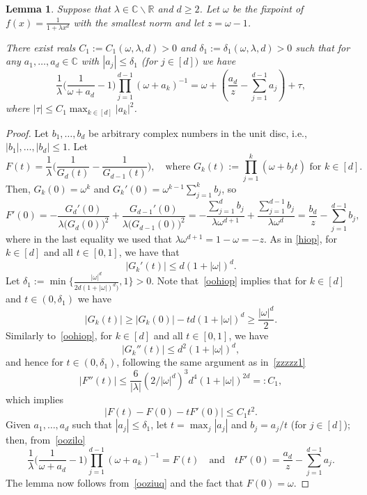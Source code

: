 \documentclass[11pt]{article}
\newtheorem{lemma}[theorem]{Lemma}
\def\Reals{\mathbb{R}}
\def\Complex{\mathbb{C}}
\begin{document}
\begin{lemma}\label{apxinv} Suppose that  $\lambda\in \Complex\backslash\Reals$ and $d\geq 2$. 
Let $\omega$ be the fixpoint of $f(x)=\frac{1}{1+\lambda x^{d}}$ with the smallest norm and let $z=\omega-1$.

There exist reals $C_1:=C_1(\omega,\lambda,d)>0$ and
$\delta_1:=\delta_1(\omega,\lambda,d)>0$ such that for
any $a_1,\dots,a_{d}\in\Complex$ with $|a_j|\leq\delta_1$ (for $j\in [d])$ we have
\begin{equation}
\frac{1}{\lambda}\Big(\frac{1}{\omega+a_{d}}-1\Big) \prod_{j=1}^{d-1} (\omega + a_k)^{-1} = \omega + \left( \frac{a_d}{z} - \sum_{j=1}^{d-1} a_j \right) + \tau,
\end{equation}
where $|\tau|\leq C_1 \max_{k\in [d]} |a_k|^2$.
\end{lemma}

\begin{proof}
Let $b_1,\hdots,b_d$ be arbitrary complex numbers in the unit disc, i.e., $|b_1|,\hdots,|b_d|\leq 1$. Let
$$
F(t) = \frac{1}{\lambda} \Bigg( \frac{1}{G_d(t)} - \frac{1}{G_{d-1}(t)} \Bigg),\quad\mbox{where }G_k(t):=\prod_{j=1}^k (\omega + b_j t) \mbox{ for $k\in [d]$}.
$$
Then,  $G_k(0)=\omega^{k}$ and $G_k'(0)=\omega^{k-1}\sum^k_{j=1}b_j$, so
\begin{equation}\label{oozilo}
F'(0) =-\frac{G_d'(0)}{\lambda\big(G_d(0)\big)^2} +\frac{G_{d-1}'(0)}{\lambda\big(G_{d-1}(0)\big)^2}=-\frac{\sum^{d}_{j=1}b_j}{\lambda \omega^{d+1}}+\frac{\sum^{d-1}_{j=1}b_j}{\lambda \omega^{d}}=\frac{b_d}{z} - \sum_{j=1}^{d-1} b_j,
\end{equation}
where in the last equality we used that $\lambda \omega^{d+1}=1-\omega=-z$. As in \eqref{hiop}, for $k\in[d]$ and all $t\in [0,1]$, we have that
\begin{equation}\label{oohiop}
|G_k'(t)| \leq d  (1+|\omega|)^d.
\end{equation}
Let $\delta_1:= \min\big\{\frac{|\omega|^d}{2 d (1+|\omega|)^{d})},1\big\}>0$. Note that~\eqref{oohiop} implies that for $k\in [d]$ and $t\in (0,\delta_1)$ we have
$$
|G_k(t)| \geq |G_k(0)| - t d (1+|\omega|)^d \geq \frac{|\omega|^d}{2}.
$$
Similarly to~\eqref{oohiop}, for $k\in[d]$ and all $t\in [0,1]$, we have 
\begin{equation}\label{oohiop2}
|G_k''(t)| \leq d^2 (1+|\omega|)^d,
\end{equation}
and hence for $t\in (0, \delta_1)$, following the same argument as in~\eqref{zzzzz1}
$$
|F''(t)| \leq \frac{6}{|\lambda|} (2/|\omega|^d )^3 d^4 (1+|\omega|)^{2d} =: C_1,
$$
which implies
\begin{equation}\label{ooziuq}
|F(t) - F(0) - t F'(0)| \leq C_1 t^2.
\end{equation}
Given $a_1,\dots,a_d$ such that $|a_j|\leq\delta_1$, let $t=\max_j |a_j|$ and $b_j=a_j/t$ (for $j\in [d]$); then, from~\eqref{oozilo}
$$
\frac{1}{\lambda}\Big(\frac{1}{\omega+a_{d}}-1\Big) \prod_{j=1}^{d-1} (\omega + a_k)^{-1} = F(t) \quad\mbox{and}\quad t F'(0) = \frac{a_d}{z} - \sum_{j=1}^{d-1} a_j.
$$
The lemma now follows from~\eqref{ooziuq} and the fact that $F(0)=\omega$.
\end{proof}
\end{document}
